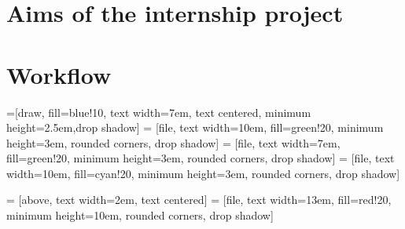 \documentclass[11pt]{report}
\begin{document}
\section{Aims of the internship project}


\newpage
\section{Workflow}

=[draw, fill=blue!10, text width=7em, 
    text centered, minimum height=2.5em,drop shadow]
 = [file, text width=10em, fill=green!20, 
    minimum height=3em, rounded corners, drop shadow]
 = [file, text width=7em, fill=green!20, 
    minimum height=3em, rounded corners, drop shadow]
 = [file, text width=10em, fill=cyan!20, 
    minimum height=3em, rounded corners, drop shadow]   

 = [above, text width=2em, text centered]
 = [file, text width=13em, fill=red!20, 
    minimum height=10em, rounded corners, drop shadow]

\def\blockdist{2.5}
\def\edgedist{2.5}
\end{document}
